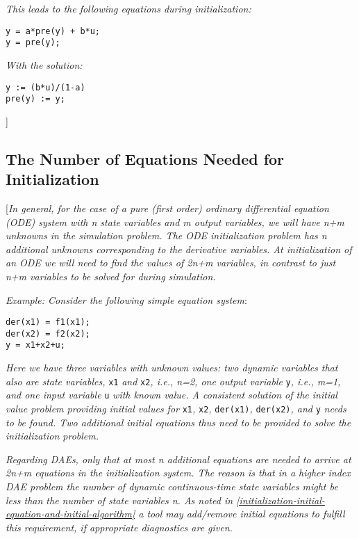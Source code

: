 \emph{This leads to the following equations during initialization:}
\begin{lstlisting}[language=modelica]
y = a*pre(y) + b*u;
y = pre(y);
\end{lstlisting}

\emph{With the solution:}
\begin{lstlisting}[language=modelica]
y := (b*u)/(1-a)
pre(y) := y;
\end{lstlisting}

{]}

\subsection{The Number of Equations Needed for Initialization}

{[}\emph{In general, for the case of a pure (first order) ordinary
differential equation (ODE) system with n state variables and m output
variables, we will have n+m unknowns in the simulation problem. The ODE
initialization problem has n additional unknowns corresponding to the
derivative variables. At initialization of an ODE we will need to find
the values of 2n+m variables, in contrast to just n+m variables to be
solved for during simulation.}

\emph{Example: Consider the following simple equation system}:
\begin{lstlisting}[language=modelica]
der(x1) = f1(x1);
der(x2) = f2(x2);
y = x1+x2+u;
\end{lstlisting}

\emph{Here we have three variables with unknown values: two dynamic
variables that also are state variables,} \lstinline!x1! \emph{and} \lstinline!x2!\emph{, i.e.,
n=2, one output variable} \lstinline!y!\emph{, i.e., m=1, and one input variable} \lstinline!u! \emph{with
known value. A consistent solution of the initial value problem
providing initial values for} \lstinline!x1!\emph{,} \lstinline!x2!\emph{,} \lstinline!der(x1)!\emph{,}
\lstinline!der(x2)!\emph{, and} \lstinline!y! \emph{needs to be found. Two additional initial
equations thus need to be provided to solve the initialization problem.}

\emph{Regarding DAEs, only that at most n additional equations are
needed to arrive at 2n+m equations in the initialization system. The
reason is that in a higher index DAE problem the number of dynamic
continuous-time state variables might be less than the number of state
variables n. As noted in \autoref{initialization-initial-equation-and-initial-algorithm} a tool may add/remove
initial equations to fulfill this requirement, if appropriate
diagnostics are given. }

